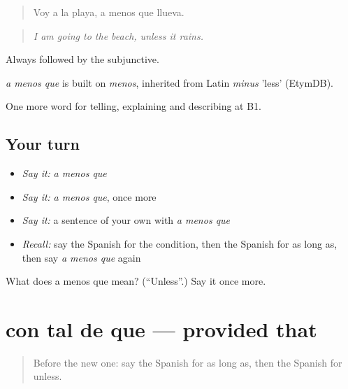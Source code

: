 \begin{quote}
Voy a la playa, a menos que llueva.
\end{quote}

\begin{quote}
\emph{I am going to the beach, unless it rains.}
\end{quote}

Always followed by the subjunctive.

\begin{cousinweb}
\emph{a menos que} is built on \emph{menos}, inherited from Latin \emph{minus} 'less' (EtymDB).
\end{cousinweb}

\begin{grammarlens}[title={What you've built}]
One more word for telling, explaining and describing at B1.
\end{grammarlens}

\subsection*{Your turn}
\begin{itemize}
\raggedright
  \item \emph{Say it:} \emph{a menos que}
  \item \emph{Say it:} \emph{a menos que}, once more
  \item \emph{Say it:} a sentence of your own with \emph{a menos que}
  \item \emph{Recall:} say the Spanish for the condition, then the Spanish for as long as, then say \emph{a menos que} again
\end{itemize}

\begin{tcolorbox}[breakable,colback=teal!4,colframe=teal!35!black,title={Before you move on}]
What does a menos que mean? (\textquotedblleft{}Unless\textquotedblright{}.) Say it once more.
\end{tcolorbox}
\section[con tal de que]{con tal de que — provided that}

\label{lesson:ES-C611-con-tal-de-que}



\begin{quote}
Before the new one: say the Spanish for as long as, then the Spanish for unless.
\end{quote}

